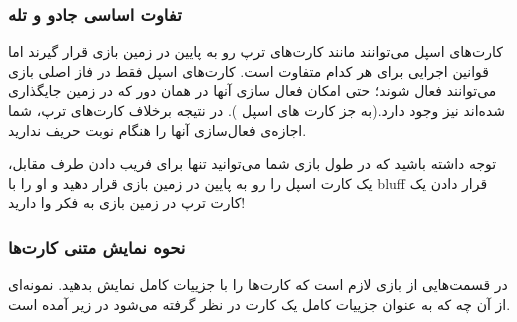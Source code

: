 \documentclass[]{article}
\begin{document}
\subsubsection*{{\titr تفاوت اساسی جادو و تله}}


کارت‌های اسپل می‌توانند مانند کارت‌های ترپ رو به پایین در زمین بازی قرار گیرند اما قوانین اجرایی برای هر کدام متفاوت است. کارت‌های اسپل فقط در فاز اصلی بازی می‌توانند فعال شوند؛ حتی امکان فعال سازی آنها در همان دور که در زمین جایگذاری شده‌اند نیز وجود دارد.(به جز کارت های اسپل ). در نتیجه  برخلاف کارت‌های ترپ، شما اجازه‌ی فعال‌سازی آنها را هنگام نوبت حریف ندارید.


توجه داشته باشید که در طول بازی شما می‌توانید تنها برای فریب دادن طرف مقابل، یک کارت اسپل را رو به پایین در زمین بازی قرار دهید و او را با bluff قرار دادن یک کارت ترپ در زمین بازی به فکر وا دارید!



\subsubsection*{{\titr نحوه نمایش متنی کارت‌ها}}

در قسمت‌هایی از بازی لازم است که کارت‌ها را با جزییات کامل نمایش بدهید. نمونه‌ای از آن چه که به عنوان جزییات کامل یک کارت در نظر گرفته می‌شود در زیر آمده است.
\end{document}
